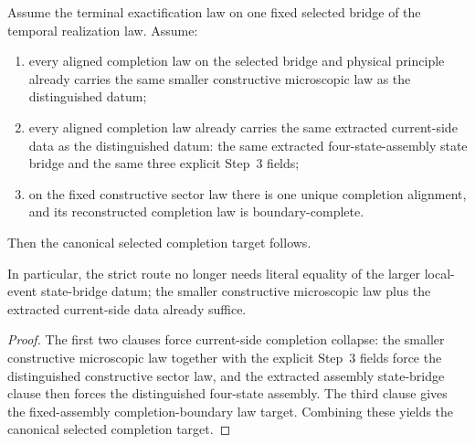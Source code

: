 \begin{theorem}
\label{thm:canonical-selected-completion-from-microscopic-current-boundary-route}
Assume the terminal exactification law on one fixed selected bridge of the
temporal realization law. Assume:
\begin{enumerate}
\item every aligned completion law on the selected bridge and physical
principle already carries the same smaller constructive microscopic law as the
distinguished datum;
\item every aligned completion law already carries the same extracted
current-side data as the distinguished datum:
the same extracted four-state-assembly state bridge and the same three
explicit Step~3 fields;
\item on the fixed constructive sector law there is one unique completion
alignment, and its reconstructed completion law is boundary-complete.
\end{enumerate}
Then the canonical selected completion target follows.

In particular, the strict route no longer needs literal equality of the larger
local-event state-bridge datum; the smaller constructive microscopic law plus
the extracted current-side data already suffice.
\end{theorem}

\begin{proof}
The first two clauses force current-side completion collapse: the smaller
constructive microscopic law together with the explicit Step~3 fields force the
distinguished constructive sector law, and the extracted assembly state-bridge
clause then forces the distinguished four-state assembly. The third clause gives
the fixed-assembly completion-boundary law target. Combining these yields the
canonical selected completion target.
\end{proof}

